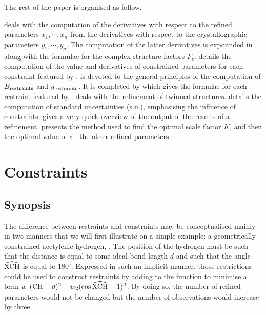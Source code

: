 \documentclass[11pt]{article}
\begin{document}
The rest of the paper is organised as follow.

 deals with the computation of the derivatives with respect to the refined parameters $x_1, \cdots, x_n$ from the derivatives with respect to the crystallographic parameters $y_1, \cdots, y_p$. The computation of the latter derivatives is expounded in  along with the formulae for the complex structure factors $F_c$.  details the computation of the value and derivatives of constrained parameters for each constraint featured by \olexrefine.  is devoted to the general principles of the computation of $B_{\text{restraints}}$ and $g_{\text{restraints}}$. It is completed by  which gives the formulae for each restraint featured by \olexrefine.  deals with the refinement of twinned structures.  details the computation of standard uncertainties (s.u.), emphasising the influence of constraints.  gives a very quick overview of the output of the results of a refinement.  presents the method used to find the optimal scale factor $K$, and then the optimal value of all the other refined parameters.

\section{Constraints}
\label{sec:constraints}

\subsection{Synopsis}

The difference between restraints and constraints may be conceptualised mainly in two manners that we will first illustrate on a simple example: a geometrically constrained acetylenic hydrogen, . The position of the hydrogen must be such that the distance  is equal to some ideal bond length $d$ and such that the angle $\widehat{\ce{XCH}}$ is equal to $180^\circ$. Expressed in such an implicit manner, those restrictions could be used to construct restraints by adding to the function to minimise a term $w_1 (\ce{CH} - d)^2 + w_2 (\cos \widehat{\ce{XCH}} - 1)^2$. By doing so, the number of refined parameters would not be changed but the number of observations would increase by three. 
\end{document}
